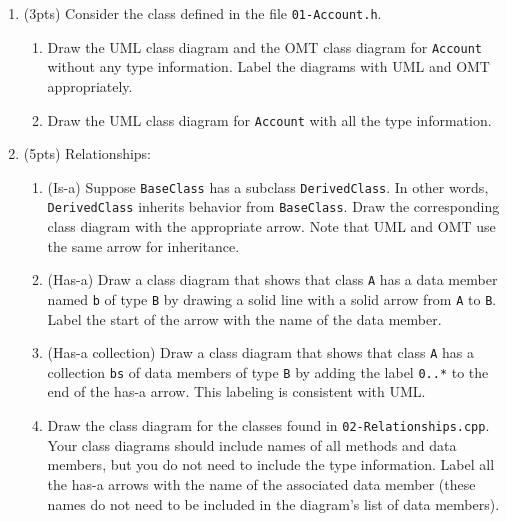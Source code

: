 \documentclass[11pt]{article}
\newlength{\up}\setlength{\up}{-\baselineskip}
\begin{document}
\begin{enumerate}

  \item (3pts) Consider the class defined in the file \texttt{01-Account.h}.

  \begin{enumerate}

    \item Draw the UML class diagram and the OMT class diagram for \texttt{Account} without any type information. Label the diagrams with UML and OMT appropriately.

    \vfill

    \item Draw the UML class diagram for \texttt{Account} with all the type information.

    \vfill

  \end{enumerate}

\newpage

  \item (5pts) Relationships:

    \begin{enumerate}

      \item (Is-a) Suppose \texttt{BaseClass} has a subclass \texttt{DerivedClass}. In other words, \texttt{DerivedClass} inherits behavior from \texttt{BaseClass}. Draw the corresponding class diagram with the appropriate arrow. Note that UML and OMT use the same arrow for inheritance.

      \vfill

      \item (Has-a) Draw a class diagram that shows that class \texttt{A} has a data member named \texttt{b} of type \texttt{B} by drawing a solid line with a solid arrow from \texttt{A} to \texttt{B}. Label the start of the arrow with the name of the data member.

      \vfill

      \item (Has-a collection) Draw a class diagram that shows that class \texttt{A} has a collection \texttt{bs} of data members of type \texttt{B} by adding the label \texttt{0..*} to the end of the has-a arrow. This labeling is consistent with UML.

      \vfill

      \item Draw the class diagram for the classes found in \texttt{02-Relationships.cpp}. Your class diagrams should include names of all methods and data members, but you do not need to include the type information. Label all the has-a arrows with the name of the associated data member (these names do not need to be included in the diagram's list of data members). 


\end{enumerate}
\end{enumerate}
\end{document}
